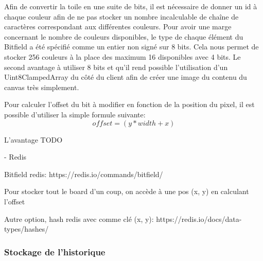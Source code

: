 Afin de convertir la toile en une suite de bits, il est nécessaire de donner un id à chaque couleur afin de ne pas stocker un nombre incalculable de chaîne de caractères correspondant aux différentes couleurs. Pour avoir une marge concernant le nombre de couleurs disponibles, le type de chaque élément du Bitfield a été spécifié comme un entier non signé sur 8 bits. Cela nous permet de stocker 256 couleurs à la place des maximum 16 disponibles avec 4 bits. Le second avantage à utiliser 8 bits et qu'il rend possible l'utilisation d'un Uint8ClampedArray \cite{uint8clampedarray} du côté du client afin de créer une image du contenu du canvas très simplement.

Pour calculer l'offset du bit à modifier en fonction de la position du pixel, il est possible d'utiliser la simple formule suivante:
\begin{equation}
  offset = (y * width + x)
\end{equation}

L'avantage TODO


- Redis

Bitfield redis: https://redis.io/commands/bitfield/

Pour stocker tout le board d'un coup, on accède à une pos (x, y) en calculant l'offset

Autre option, hash redis avec comme clé (x, y): https://redis.io/docs/data-types/hashes/

\subsubsection{Stockage de l'historique}


